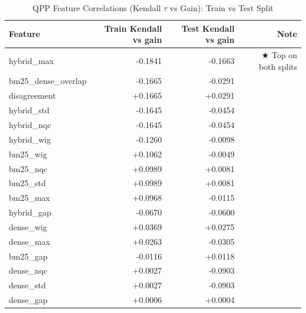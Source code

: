 \begin{table}[H]
\centering
\caption{QPP Feature Correlations (Kendall $\tau$ vs Gain): Train vs Test Split}
\label{tab:val_qpp}
\begin{tabular}{lrrr}
\toprule
Feature & Train Kendall vs gain & Test Kendall vs gain & Note \\
\midrule
hybrid\_max & -0.1841 & -0.1663 & ★ Top on both splits \\
bm25\_dense\_overlap & -0.1665 & -0.0291 &  \\
disagreement & +0.1665 & +0.0291 &  \\
hybrid\_std & -0.1645 & -0.0454 &  \\
hybrid\_nqc & -0.1645 & -0.0454 &  \\
hybrid\_wig & -0.1260 & -0.0098 &  \\
bm25\_wig & +0.1062 & -0.0049 &  \\
bm25\_nqc & +0.0989 & +0.0081 &  \\
bm25\_std & +0.0989 & +0.0081 &  \\
bm25\_max & +0.0968 & -0.0115 &  \\
hybrid\_gap & -0.0670 & -0.0600 &  \\
dense\_wig & +0.0369 & +0.0275 &  \\
dense\_max & +0.0263 & -0.0305 &  \\
bm25\_gap & -0.0116 & +0.0118 &  \\
dense\_nqc & +0.0027 & -0.0903 &  \\
dense\_std & +0.0027 & -0.0903 &  \\
dense\_gap & +0.0006 & +0.0004 &  \\
\bottomrule
\end{tabular}
\end{table}